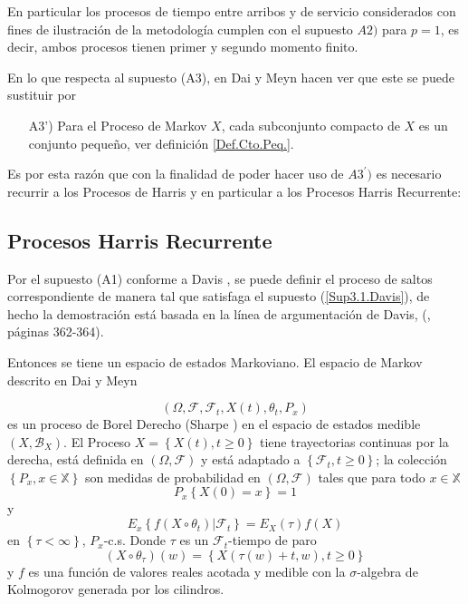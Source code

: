 En particular los procesos de tiempo entre arribos y de servicio
considerados con fines de ilustraci\'on de la metodolog\'ia
cumplen con el supuesto $A2)$ para $p=1$, es decir, ambos procesos
tienen primer y segundo momento finito.

En lo que respecta al supuesto (A3), en Dai y Meyn \cite{DaiSean}
hacen ver que este se puede sustituir por

\begin{itemize}
\item[A3')] Para el Proceso de Markov $X$, cada subconjunto
compacto de $X$ es un conjunto peque\~no, ver definici\'on
\ref{Def.Cto.Peq.}.
\end{itemize}

Es por esta raz\'on que con la finalidad de poder hacer uso de
$A3^{'})$ es necesario recurrir a los Procesos de Harris y en
particular a los Procesos Harris Recurrente:
\subsection{Procesos Harris Recurrente}

Por el supuesto (A1) conforme a Davis \cite{Davis}, se puede
definir el proceso de saltos correspondiente de manera tal que
satisfaga el supuesto (\ref{Sup3.1.Davis}), de hecho la
demostraci\'on est\'a basada en la l\'inea de argumentaci\'on de
Davis, (\cite{Davis}, p\'aginas 362-364).

Entonces se tiene un espacio de estados Markoviano. El espacio de
Markov descrito en Dai y Meyn \cite{DaiSean}

\[\left(\Omega,\mathcal{F},\mathcal{F}_{t},X\left(t\right),\theta_{t},P_{x}\right)\]
es un proceso de Borel Derecho (Sharpe \cite{Sharpe}) en el
espacio de estados medible $\left(X,\mathcal{B}_{X}\right)$. El
Proceso $X=\left\{X\left(t\right),t\geq0\right\}$ tiene
trayectorias continuas por la derecha, est\'a definida en
$\left(\Omega,\mathcal{F}\right)$ y est\'a adaptado a
$\left\{\mathcal{F}_{t},t\geq0\right\}$; la colecci\'on
$\left\{P_{x},x\in \mathbb{X}\right\}$ son medidas de probabilidad
en $\left(\Omega,\mathcal{F}\right)$ tales que para todo $x\in
\mathbb{X}$
\[P_{x}\left\{X\left(0\right)=x\right\}=1\] y
\[E_{x}\left\{f\left(X\circ\theta_{t}\right)|\mathcal{F}_{t}\right\}=E_{X}\left(\tau\right)f\left(X\right)\]
en $\left\{\tau<\infty\right\}$, $P_{x}$-c.s. Donde $\tau$ es un
$\mathcal{F}_{t}$-tiempo de paro
\[\left(X\circ\theta_{\tau}\right)\left(w\right)=\left\{X\left(\tau\left(w\right)+t,w\right),t\geq0\right\}\]
y $f$ es una funci\'on de valores reales acotada y medible con la
$\sigma$-algebra de Kolmogorov generada por los cilindros.\\

